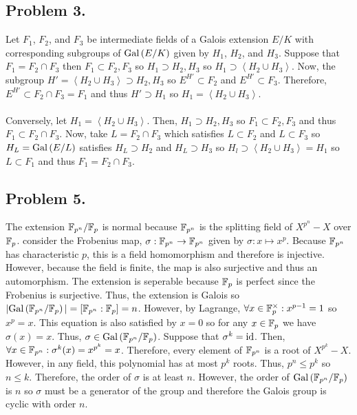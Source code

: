 \documentclass[12pt]{extarticle}
\begin{document}
\subsection*{Problem 3.}
Let $F_1$, $F_2$, and $F_3$ be intermediate fields of a Galois extension $E/K$ with corresponding subgroups of $\mathrm{Gal}\left( E/K \right)$ given by $H_1$, $H_2$, and $H_3$. Suppose that $F_1 = F_2 \cap F_3$ then $F_1 \subset F_2, F_3$ so $H_1 \supset H_2, H_3$ so $H_1 \supset \left< H_2 \cup H_3 \right>$. Now, the subgroup $H' = \left< H_2 \cup H_3 \right> \supset H_2, H_3$ so $E^{H'} \subset F_2$ and $E^{H'} \subset F_3$. Therefore, $E^{H'} \subset F_2 \cap F_3 = F_1$ and thus $H' \supset H_1$ so $H_1 = \left< H_2 \cup H_3 \right>$. \\\\ 
Conversely, let $H_1 = \left< H_2 \cup H_3 \right>$. Then, $H_1 \supset H_2, H_3$ so $F_1 \subset F_2, F_3$ and thus $F_1 \subset F_2 \cap F_3$. Now, take $L = F_2 \cap F_3$ which satisfies $L \subset F_2$ and $L \subset F_3$ so $H_L = \mathrm{Gal}\left( E/L \right)$ satisfies $H_L \supset H_2$ and $H_L \supset H_3$ so $H_l \supset \left< H_2 \cup H_3 \right> = H_1$ so $L \subset F_1$ and thus $F_1 = F_2 \cap F_3$. 

\subsection*{Problem 5.}   

The extension $\mathbb{F}_{p^n}/\mathbb{F}_{p}$ is normal because $\mathbb{F}_{p^n}$ is the splitting field of $X^{p^n} - X$ over $\mathbb{F}_{p}$. consider the Frobenius map, $\sigma : \mathbb{F}_{p^n} \to \mathbb{F}_{p^n}$ given by $\sigma : x \mapsto x^p$. Because $\mathbb{F}_{p^n}$ has characteristic $p$, this is a field homomorphism and therefore is injective. However, because the field is finite, the map is also surjective and thus an automorphism. The extension is seperable because $\mathbb{F}_{p}$ is perfect since the Frobenius is surjective. Thus, the extension is Galois so $|\mathrm{Gal}\left( \mathbb{F}_{p^n} /\mathbb{F}_{p} \right)| = [\mathbb{F}_{p^n} : \mathbb{F}_{p}] = n$. However, by Lagrange, $\forall x \in \mathbb{F}_{p}^{\times} : x^{p-1} = 1$ so $x^p = x$. This equation is also satisfied by $x = 0$ so for any $x \in \mathbb{F}_{p}$ we have $\sigma(x) = x$. Thus, $\sigma \in \mathrm{Gal}\left( \mathbb{F}_{p^n}/\mathbb{F}_{p} \right)$. Suppose that $\sigma^k = \mathrm{id}$. Then, $\forall x \in \mathbb{F}_{p^n} : \sigma^k(x) = x^{p^k} = x$. Therefore, every element of $\mathbb{F}_{p^n}$ is a root of $X^{p^k} - X$. However, in any field, this polynomial has at most $p^k$ roots. Thus, $p^n \le p^k$ so $n \le k$. Therefore, the order of $\sigma$ is at least $n$. However, the order of $\mathrm{Gal}\left( \mathbb{F}_{p^n}/\mathbb{F}_{p} \right)$ is $n$ so $\sigma$ must be a generator of the group and therefore the Galois group is cyclic with order $n$.  
        
\end{document}
